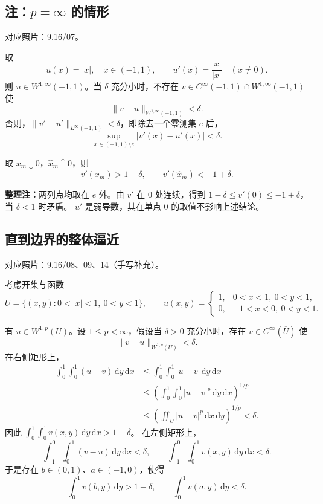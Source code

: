 \documentclass[UTF8,a4paper,11pt,fontset=fandol]{ctexart}
\newcommand{\dd}{\,\mathrm d}
\newcommand{\ednote}[1]{\par{\small\color{notegray}\textbf{整理注：}#1}\par}
\newcommand{\source}[1]{{\small\color{notegray}对应照片：#1。}\par}
\begin{document}
\subsection*{注：$p=\infty$ 的情形}
\source{9.16/07}
取
\[
u(x)=|x|,\quad x\in(-1,1),\qquad
u'(x)=\frac{x}{|x|}\quad(x\ne0).
\]
则 $u\in W^{1,\infty}(-1,1)$。当 $\delta$ 充分小时，不存在
$v\in C^\infty(-1,1)\cap W^{1,\infty}(-1,1)$ 使
\[
\|v-u\|_{W^{1,\infty}(-1,1)}<\delta.
\]
否则，$\|v'-u'\|_{L^\infty(-1,1)}<\delta$，即除去一个零测集 $e$ 后，
\[
\sup_{x\in(-1,1)\setminus e}|v'(x)-u'(x)|<\delta.
\]
\begin{center}
\end{center}
取 $x_m\downarrow0$，$\hat x_m\uparrow0$，则
\[
v'(x_m)>1-\delta,\qquad v'(\hat x_m)<-1+\delta.
\]
\ednote{两列点均取在 $e$ 外。由 $v'$ 在 $0$ 处连续，得到
$1-\delta\leq v'(0)\leq-1+\delta$，当 $\delta<1$ 时矛盾。
$u'$ 是弱导数，其在单点 $0$ 的取值不影响上述结论。}

\newpage
\subsection{直到边界的整体逼近}
\source{9.16/08、09、14（手写补充）}
考虑开集与函数
\[
U=\{(x,y):0<|x|<1,\ 0<y<1\},\qquad
u(x,y)=\begin{cases}
1,&0<x<1,\ 0<y<1,\\
0,&-1<x<0,\ 0<y<1.
\end{cases}
\]
\begin{center}
\end{center}
有 $u\in W^{1,p}(U)$。设 $1\leq p<\infty$，假设当 $\delta>0$ 充分小时，存在
$v\in C^\infty(\overline U)$ 使
\[
\|v-u\|_{W^{1,p}(U)}<\delta.
\]
在右侧矩形上，
\[
\begin{aligned}
\int_0^1\!\int_0^1(u-v)\dd y\dd x
&\leq\int_0^1\!\int_0^1|u-v|\dd y\dd x\\
&\leq\left(\int_0^1\!\int_0^1|u-v|^p\dd y\dd x\right)^{1/p}\\
&\leq\left(\iint_U|u-v|^p\dd x\dd y\right)^{1/p}<\delta.
\end{aligned}
\]
因此 $\displaystyle\int_0^1\!\int_0^1v(x,y)\dd y\dd x>1-\delta$。
在左侧矩形上，
\[
\int_{-1}^0\!\int_0^1(v-u)\dd y\dd x<\delta,
\qquad\int_{-1}^0\!\int_0^1v(x,y)\dd y\dd x<\delta.
\]
于是存在 $b\in(0,1)$、$a\in(-1,0)$，使得
\[
\int_0^1v(b,y)\dd y>1-\delta,\qquad
\int_0^1v(a,y)\dd y<\delta.
\]
\end{document}
